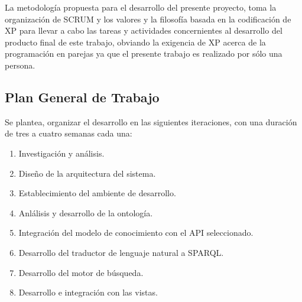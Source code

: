 La metodología propuesta para el desarrollo del presente proyecto, toma la organización de SCRUM y los valores y la filosofía basada en la codificación de XP para llevar a cabo las tareas y actividades concernientes al desarrollo del producto final de este trabajo, obviando la exigencia de XP acerca de la programación en parejas ya que el presente trabajo es realizado por sólo una persona.

\subsection{Plan General de Trabajo}
Se plantea, organizar el desarrollo en las siguientes iteraciones, con una duración de tres a cuatro semanas cada una:

\begin{enumerate}
\item Investigación y análisis.
\item Diseño de la arquitectura del sistema.
\item Establecimiento del ambiente de desarrollo.
\item Anlálisis y desarrollo de la ontología.
\item Integración del modelo de conocimiento con el API seleccionado.
\item Desarrollo del traductor de lenguaje natural a SPARQL.
\item Desarrollo del motor de búsqueda.
\item Desarrollo e integración con las vistas.
\end{enumerate}

\newpage

